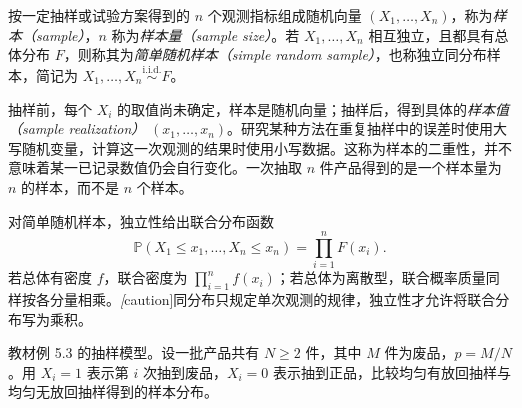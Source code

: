 \begin{definition}[样本与简单随机样本]
\label{def:study-iid-sample}
按一定抽样或试验方案得到的 $n$ 个观测指标组成随机向量 $(X_1,\ldots,X_n)$，称为\emph{样本（sample）}，$n$ 称为\emph{样本量（sample size）}。若 $X_1,\ldots,X_n$ 相互独立，且都具有总体分布 $F$，则称其为\emph{简单随机样本（simple random sample）}，也称独立同分布样本，简记为 $X_1,\ldots,X_n\overset{\mathrm{i.i.d.}}{\sim}F$。
\end{definition}

抽样前，每个 $X_i$ 的取值尚未确定，样本是随机向量；抽样后，得到具体的\emph{样本值（sample realization）} $(x_1,\ldots,x_n)$。研究某种方法在重复抽样中的误差时使用大写随机变量，计算这一次观测的结果时使用小写数据。这称为样本的二重性，并不意味着某一已记录数值仍会自行变化。一次抽取 $n$ 件产品得到的是一个样本量为 $n$ 的样本，而不是 $n$ 个样本。

对简单随机样本，独立性给出联合分布函数
\begin{equation}
  \mathbb P(X_1\le x_1,\ldots,X_n\le x_n)
  =\prod_{i=1}^{n}F(x_i).
  \label{eq:study-iid-joint-cdf}
\end{equation}
若总体有密度 $f$，联合密度为 $\prod_{i=1}^{n}f(x_i)$；若总体为离散型，联合概率质量同样按各分量相乘。\emph[caution]{同分布只规定单次观测的规律，独立性才允许将联合分布写为乘积。}

\begin{example}
\label{ex:study-replacement-sampling}
教材例 5.3 的抽样模型。设一批产品共有 $N\ge2$ 件，其中 $M$ 件为废品，$p=M/N$。用 $X_i=1$ 表示第 $i$ 次抽到废品，$X_i=0$ 表示抽到正品，比较均匀有放回抽样与均匀无放回抽样得到的样本分布。
\end{example}

